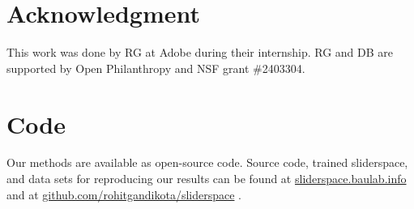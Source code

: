 \section*{Acknowledgment}
This work was done by RG at Adobe during their internship. RG and DB are supported by Open Philanthropy and NSF grant \#2403304.

\section*{Code}
Our methods are available as open-source code. Source code, trained sliderspace, and data sets for reproducing our results can be found at \href{https://sliderspace.baulab.info/}{\textcolor[rgb]{0.21,0.49,0.74}{sliderspace.baulab.info}} and at \href{https://github.com/rohitgandikota/sliderspace/}{\textcolor[rgb]{0.21,0.49,0.74}{github.com/rohitgandikota/sliderspace}}
.